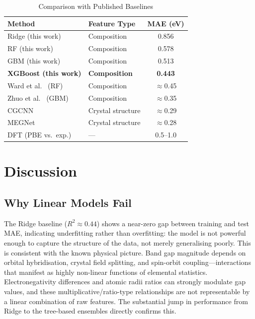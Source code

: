 \documentclass[conference]{IEEEtran}
\begin{document}
\begin{table}[H]
  \centering
  \caption{Comparison with Published Baselines}
  \label{tab:benchmarks}
  \begin{tabular}{llc}
    \toprule
    \textbf{Method} & \textbf{Feature Type} & \textbf{MAE (eV)} \\
    \midrule
    Ridge (this work)       & Composition & 0.856 \\
    RF (this work)          & Composition & 0.578 \\
    GBM (this work)         & Composition & 0.513 \\
    \textbf{XGBoost (this work)} & \textbf{Composition} & \textbf{0.443} \\
    Ward et al.\ \cite{ward2016} (RF) & Composition & $\approx$0.45 \\
    Zhuo et al.\ \cite{zhuo2018} (GBM) & Composition & $\approx$0.35 \\
    CGCNN \cite{xie2018}    & Crystal structure & $\approx$0.29 \\
    MEGNet \cite{chen2019}  & Crystal structure & $\approx$0.28 \\
    DFT (PBE vs.\ exp.)     & --- & 0.5--1.0 \\
    \bottomrule
  \end{tabular}
\end{table}

\section{Discussion}

\subsection{Why Linear Models Fail}

The Ridge baseline ($R^2 \approx 0.44$) shows a near-zero gap between training and test MAE, indicating underfitting rather than overfitting: the model is not powerful enough to capture the structure of the data, not merely generalising poorly. This is consistent with the known physical picture. Band gap magnitude depends on orbital hybridisation, crystal field splitting, and spin-orbit coupling---interactions that manifest as highly non-linear functions of elemental statistics. Electronegativity differences and atomic radii ratios can strongly modulate gap values, and these multiplicative/ratio-type relationships are not representable by a linear combination of raw features. The substantial jump in performance from Ridge to the tree-based ensembles directly confirms this.
\end{document}
